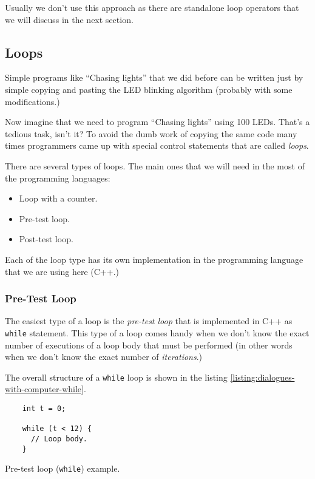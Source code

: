 \documentclass[../sparc.tex]{subfiles}
\begin{document}
Usually we don't use this approach as there are standalone loop operators that
we will discuss in the next section.

\subsection{Loops}

Simple programs like ``Chasing lights'' that we did before can be written just
by simple copying and pasting the LED blinking algorithm (probably with some
modifications.)

Now imagine that we need to program ``Chasing lights'' using 100 LEDs.  That's a
tedious task, isn't it?  To avoid the dumb work of copying the same code many
times programmers came up with special control statements that are called
\emph{loops}.

There are several types of loops.  The main ones that we will need in the most
of the programming languages:
\begin{itemize}
\item Loop with a counter.
\item Pre-test loop.
\item Post-test loop.
\end{itemize}

Each of the loop type has its own implementation in the programming language
that we are using here (C++.)

\subsubsection{Pre-Test Loop}

The easiest type of a loop is the \emph{pre-test loop} that is implemented in
C++ as \texttt{while} statement.  This type of a loop comes handy when we don't
know the exact number of executions of a loop body that must be performed (in
other words when we don't know the exact number of \emph{iterations}.)

The overall structure of a \texttt{while} loop is shown in the listing
\ref{listing:dialogues-with-computer-while}.

\begin{listing}[ht]
  \begin{verbatim}
    int t = 0;

    while (t < 12) {
      // Loop body.
    }
  \end{verbatim}
  \label{listing:dialogues-with-computer-while}
  \caption{Pre-test loop (\texttt{while}) example.}
\end{listing}
\end{document}
